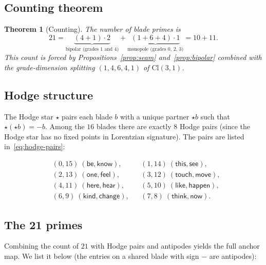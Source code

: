 \documentclass[11pt,a4paper]{article}
\theoremstyle{plain}
\newtheorem{theorem}{Theorem}[section]
\theoremstyle{definition}
\theoremstyle{remark}
\numberwithin{equation}{section}
\providecommand{\Cl}{\mathrm{Cl}}
\begin{document}
\subsection{Counting theorem}

\begin{theorem}[Counting]\label{thm:counting}
The number of blade primes is
\[
  21
  =
  \underbrace{(4 + 1) \cdot 2}_{\text{bipolar (grades 1 and 4)}}
  +
  \underbrace{(1 + 6 + 4) \cdot 1}_{\text{monopole (grades 0, 2, 3)}}
  = 10 + 11.
\]
This count is forced by Propositions~\ref{prop:seam}
and~\ref{prop:bipolar} combined with the grade-dimension
splitting $(1, 4, 6, 4, 1)$ of $\Cl(3,1)$.
\end{theorem}

\subsection{Hodge structure}

The Hodge star $\star$ pairs each blade $b$ with a unique partner
$\star b$ such that $\star(\star b) = -b$.  Among the $16$ blades
there are exactly $8$ Hodge pairs (since the Hodge star has no
fixed points in Lorentzian signature).  The pairs are listed
in~\eqref{eq:hodge-pairs}:

\begin{equation}\label{eq:hodge-pairs}
\begin{aligned}
& (0, 15)\ (\mathsf{be}, \mathsf{know}), &
& (1, 14)\ (\mathsf{this}, \mathsf{see}), \\
& (2, 13)\ (\mathsf{one}, \mathsf{feel}), &
& (3, 12)\ (\mathsf{touch}, \mathsf{move}), \\
& (4, 11)\ (\mathsf{here}, \mathsf{hear}), &
& (5, 10)\ (\mathsf{like}, \mathsf{happen}), \\
& (6, 9)\ (\mathsf{kind}, \mathsf{change}), &
& (7, 8)\ (\mathsf{think}, \mathsf{now}).
\end{aligned}
\end{equation}

\subsection{The 21 primes}

Combining the count of $21$ with Hodge pairs and antipodes yields
the full anchor map.  We list it below (the entries on a shared
blade with sign $-$ are antipodes):
\end{document}
